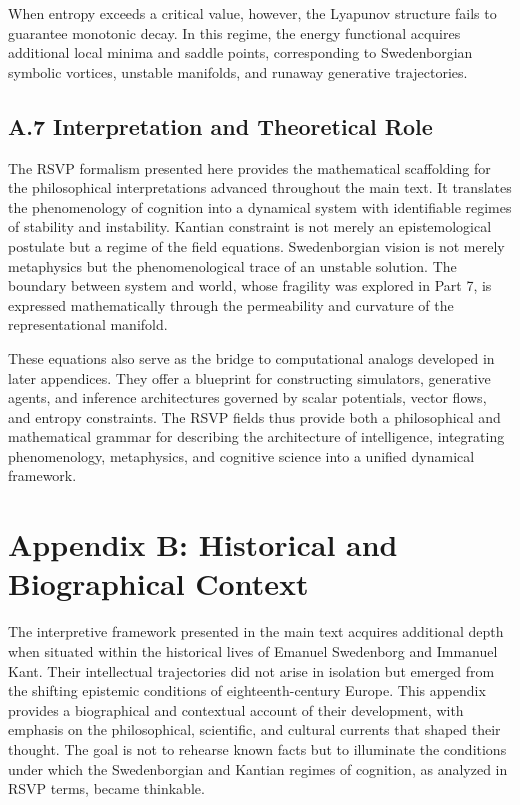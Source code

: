 \documentclass[12pt]{article}
\begin{document}
When entropy exceeds a critical value, however, the Lyapunov structure fails 
to guarantee monotonic decay. In this regime, the energy functional acquires 
additional local minima and saddle points, corresponding to Swedenborgian 
symbolic vortices, unstable manifolds, and runaway generative trajectories.

\subsection*{A.7 Interpretation and Theoretical Role}

The RSVP formalism presented here provides the mathematical scaffolding for the 
philosophical interpretations advanced throughout the main text. It translates 
the phenomenology of cognition into a dynamical system with identifiable 
regimes of stability and instability. Kantian constraint is not merely an 
epistemological postulate but a regime of the field equations. Swedenborgian 
vision is not merely metaphysics but the phenomenological trace of an unstable 
solution. The boundary between system and world, whose fragility was explored 
in Part 7, is expressed mathematically through the permeability and curvature 
of the representational manifold.

These equations also serve as the bridge to computational analogs developed in 
later appendices. They offer a blueprint for constructing simulators, 
generative agents, and inference architectures governed by scalar potentials, 
vector flows, and entropy constraints. The RSVP fields thus provide both a 
philosophical and mathematical grammar for describing the architecture of 
intelligence, integrating phenomenology, metaphysics, and cognitive science 
into a unified dynamical framework.

\newpage
\section*{Appendix B: Historical and Biographical Context}

The interpretive framework presented in the main text acquires additional depth 
when situated within the historical lives of Emanuel Swedenborg and Immanuel 
Kant. Their intellectual trajectories did not arise in isolation but emerged 
from the shifting epistemic conditions of eighteenth-century Europe. This 
appendix provides a biographical and contextual account of their development, 
with emphasis on the philosophical, scientific, and cultural currents that 
shaped their thought. The goal is not to rehearse known facts but to illuminate 
the conditions under which the Swedenborgian and Kantian regimes of cognition, 
as analyzed in RSVP terms, became thinkable.
\end{document}
